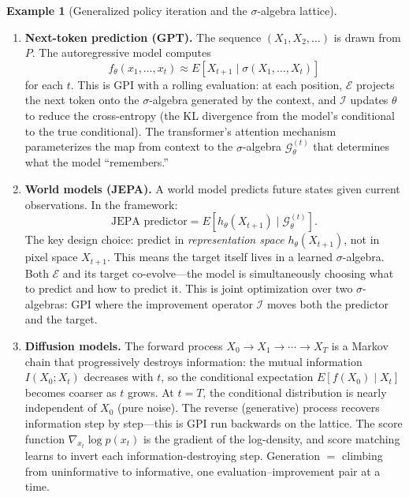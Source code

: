 \documentclass[12pt]{amsart}
\theoremstyle{definition}
\newtheorem{example}[theorem]{Example}
\theoremstyle{remark}
\begin{document}
\begin{example}[Generalized policy iteration and the $\sigma$-algebra lattice]
\begin{enumerate}[label=(\alph*)]
\item \textbf{Next-token prediction (GPT).} The sequence $(X_1, X_2, \ldots)$ is drawn from $P$. The autoregressive model computes
\[
f_\theta(x_1, \ldots, x_t) \approx E[X_{t+1} \mid \sigma(X_1, \ldots, X_t)]
\]
for each $t$. This is GPI with a rolling evaluation: at each position, $\mathcal{E}$ projects the next token onto the $\sigma$-algebra generated by the context, and $\mathcal{I}$ updates $\theta$ to reduce the cross-entropy (the KL divergence from the model's conditional to the true conditional). The transformer's attention mechanism parameterizes the map from context to the $\sigma$-algebra $\mathcal{G}_\theta^{(t)}$ that determines what the model ``remembers.''

\item \textbf{World models (JEPA).} A world model predicts future states given current observations. In the framework:
\[
\text{JEPA predictor} = E[h_\theta(X_{t+1}) \mid \mathcal{G}_\theta^{(t)}].
\]
The key design choice: predict in \emph{representation space} $h_\theta(X_{t+1})$, not in pixel space $X_{t+1}$. This means the target itself lives in a learned $\sigma$-algebra. Both $\mathcal{E}$ and its target co-evolve---the model is simultaneously choosing what to predict and how to predict it. This is joint optimization over two $\sigma$-algebras: GPI where the improvement operator $\mathcal{I}$ moves both the predictor and the target.

\item \textbf{Diffusion models.} The forward process $X_0 \to X_1 \to \cdots \to X_T$ is a Markov chain that progressively destroys information: the mutual information $I(X_0; X_t)$ decreases with $t$, so the conditional expectation $E[f(X_0) \mid X_t]$ becomes coarser as $t$ grows. At $t = T$, the conditional distribution is nearly independent of $X_0$ (pure noise). The reverse (generative) process recovers information step by step---this is GPI run backwards on the lattice. The score function $\nabla_{x_t} \log p(x_t)$ is the gradient of the log-density, and score matching learns to invert each information-destroying step. Generation $=$ climbing from uninformative to informative, one evaluation--improvement pair at a time.

\end{enumerate}
\end{example}
\end{document}
